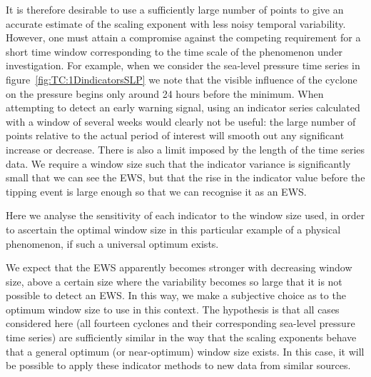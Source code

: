 It is therefore desirable to use a sufficiently large number of points to give an accurate estimate of the scaling exponent with less noisy temporal variability. However, one must attain a compromise against the competing requirement for a short time window corresponding to the time scale of the phenomenon under investigation. For example, when we consider the sea-level pressure time series in figure~\ref{fig:TC:1DindicatorsSLP} we note that the visible influence of the cyclone on the pressure begins only around 24 hours before the minimum. When attempting to detect an early warning signal, using an indicator series calculated with a window of several weeks would clearly not be useful: the large number of points relative to the actual period of interest will smooth out any significant increase or decrease. There is also a limit imposed by the length of the time series data. We require a window size such that the indicator variance is significantly small that we can see the EWS, but that the rise in the indicator value before the tipping event is large enough so that we can recognise it as an EWS.

Here we analyse the sensitivity of each indicator to the window size used, in order to ascertain the optimal window size in this particular example of a physical phenomenon, if such a universal optimum exists.

We expect that the EWS apparently becomes stronger with decreasing window size, above a certain size where the variability becomes so large that it is not possible to detect an EWS. In this way, we make a subjective choice as to the optimum window size to use in this context. The hypothesis is that all cases considered here (all fourteen cyclones and their corresponding sea-level pressure time series) are sufficiently similar in the way that the scaling exponents behave that a general optimum (or near-optimum) window size exists. In this case, it will be possible to apply these indicator methods to new data from similar sources.


